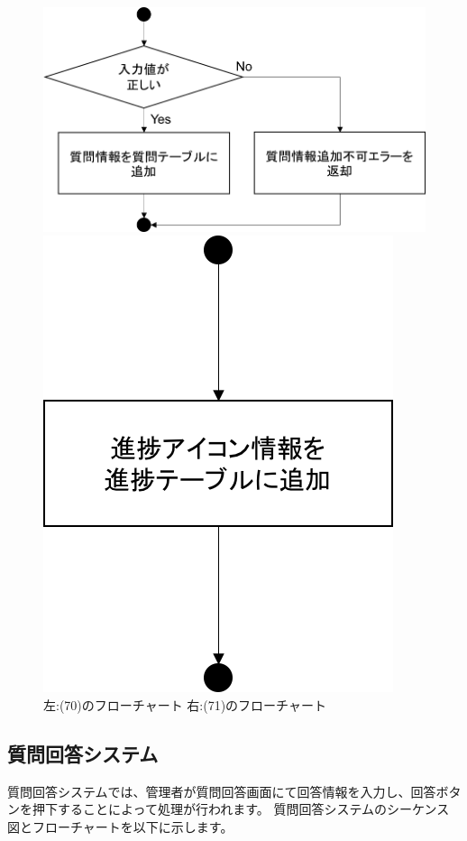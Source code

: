 \begin{figure}[htbp]
 \begin{minipage}{0.5\hsize}
  \begin{center}
   \includegraphics[width=0.85\linewidth,clip]{./img/flow/70.png}
  \end{center}
 \end{minipage}
 \begin{minipage}{0.5\hsize}
  \begin{center}
   \includegraphics[width=0.5\linewidth,clip]{./img/flow/71.png}
  \end{center}
 \end{minipage}
 \caption{左:(70)のフローチャート 右:(71)のフローチャート}\label{fig:70to71}
\end{figure}


\clearpage





\subsection{質問回答システム}
質問回答システムでは、管理者が質問回答画面にて回答情報を入力し、回答ボタンを押下することによって処理が行われます。
質問回答システムのシーケンス図とフローチャートを以下に示します。

